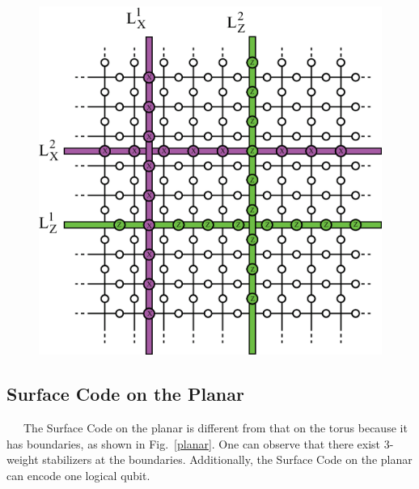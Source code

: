 \documentclass[a4paper,11pt]{ltjsarticle}
\begin{document}
{{    \begin{figure}[h]
        \centering
        \includegraphics[scale=0.40]{figure/logical_operator.eps}
        \vspace{0pt}\caption{}
        \label{logical_operator}
        \vspace{-10pt}
    \end{figure}
    }


    \subsection{Surface Code on the Planar}{
        \ \ \ The Surface Code on the planar is different from that on the torus because it has boundaries, as shown in Fig.~\ref{planar}. One can observe that there exist 3-weight stabilizers at the boundaries. Additionally, the Surface Code on the planar can encode one logical qubit.

}}
\end{document}
